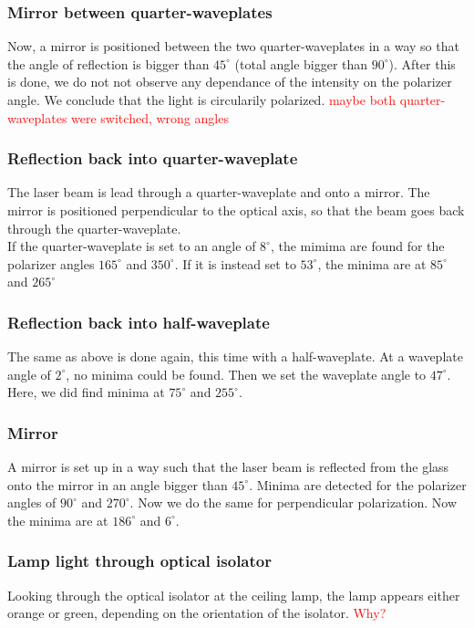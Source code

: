 \newpage
\subsubsection{Mirror between quarter-waveplates}
Now, a mirror is positioned between the two quarter-waveplates
in a way so that the angle of reflection is bigger than $45^\circ$
(total angle bigger than $90^\circ$). After this is done, we do not
not observe any dependance of the intensity on the polarizer angle.
We conclude that the light is circularily polarized.
\textcolor{red}{maybe both quarter-waveplates were switched, wrong angles}

\subsubsection{Reflection back into quarter-waveplate}
The laser beam is lead through a quarter-waveplate and onto a mirror.
The mirror is positioned perpendicular to the optical axis, so that
the beam goes back through the quarter-waveplate. \\
If the quarter-waveplate is set to an angle of $8^\circ$, 
the mimima are found for the polarizer angles $165^\circ$ and $350^\circ$.
If it is instead set to $53^\circ$, the minima are at $85^\circ$ and
$265^\circ$

\subsubsection{Reflection back into half-waveplate}
The same as above is done again, this time with a half-waveplate.
At a waveplate angle of $2^\circ$, no minima could be found.
Then we set the waveplate angle to $47^\circ$. Here, we did find minima
at $75^\circ$ and $255^\circ$.

\subsubsection{Mirror}
A mirror is set up in a way such that the laser beam is reflected from
the glass onto the mirror in an angle bigger than $45^\circ$.
Minima are detected for the polarizer angles of $90^\circ$ and $270^\circ$.
Now we do the same for perpendicular polarization. Now the minima are
at $186^\circ$ and $6^\circ$.

\subsubsection{Lamp light through optical isolator}
Looking through the optical isolator at the ceiling lamp, the lamp
appears either orange or green, depending on the orientation of the
isolator. \textcolor{red}{Why?}


